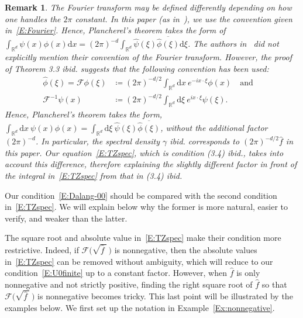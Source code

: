 \documentclass[sn-mathphys]{sn-jnl}%
\renewcommand{\R}{\mathbb{R}}
\newcommand{\ud}{\ensuremath{\mathrm{d}}}
\numberwithin{equation}{section}
\theoremstyle{thmstyleone}%
\theoremstyle{thmstyletwo}%
\newtheorem{remark}{Remark}[section]%
\theoremstyle{thmstylethree}%
\begin{document}
\begin{remark}\label{R:Fourier}
  The Fourier transform may be defined differently depending on how one handles the $2\pi$ constant.
  In this paper (as in~\cite{chen.kim:19:nonlinear,chen.huang:19:comparison}), we use the convention
  given in~\eqref{E:Fourier}. Hence, Plancherel's theorem takes the form of $\int_{\R^d} \psi(x)
  \phi(x)\ud x = (2\pi)^{-d} \int_{\R^d} \widehat{\psi}(\xi) \overline{\widehat{\phi}(\xi)}\ud \xi$.
  The authors in~\cite{tessitore.zabczyk:98:invariant} did not explicitly mention their convention
  of the Fourier transform. However, the proof of Theorem 3.3 \textit{ibid.} suggests that the
  following convention has been used:
	\begin{align*}
    \widehat{\phi}(\xi) = \mathcal{F}\phi(\xi) & \coloneqq (2\pi)^{-d/2} \int_{\R^d}\ud x \: e^{-i x\cdot\xi} \phi(x) \quad \text{and} \quad \\
    \mathcal{F}^{-1}\psi(x)                    & \coloneqq (2\pi)^{-d/2} \int_{\R^d}\ud\xi\: e^{i x\cdot\xi} \psi(\xi).
	\end{align*}
  Hence, Plancherel's theorem takes the form, $\int_{\R^d}\ud x\: \psi(x) \phi(x)= \int_{\R^d} \ud
  \xi\: \widehat{\psi}(\xi) \overline{\widehat{\phi}(\xi)}$, without the additional factor
  $(2\pi)^{-d}$. In particular, the spectral density $\gamma$ \textit{ibid.} corresponds to
  $\left(2\pi\right)^{-d/2}\widehat{f}$ in this paper. Our equation~\eqref{E:TZspec}, which is
  condition (3.4) \textit{ibid.}, takes into account this difference, therefore explaining the
  slightly different factor in front of the integral in~\eqref{E:TZspec} from that in (3.4)
  \textit{ibid.}
\end{remark}

Our condition~\eqref{E:Dalang-00} should be compared with the second condition in~\eqref{E:TZspec}.
We will explain below why the former is more natural, easier to verify, and weaker than the latter.

The square root and absolute value in~\eqref{E:TZspec} make their condition more restrictive.
Indeed, if $\mathcal{F}\big(\sqrt{\widehat{f}\:}\:\big)$ is nonnegative, then the absolute values
in~\eqref{E:TZspec} can be removed without ambiguity, which will reduce to our
condition~\eqref{E:U0finite} up to a constant factor. However, when $\widehat{f}$ is only
nonnegative and not strictly positive, finding the right square root of $\widehat{f}$ so that
$\mathcal{F}\big(\sqrt{\widehat{f}\:}\:\big)$ is nonnegative becomes tricky. This last point will be
illustrated by the examples below. We first set up the notation in Example~\ref{Ex:nonnegative}.
\end{document}
